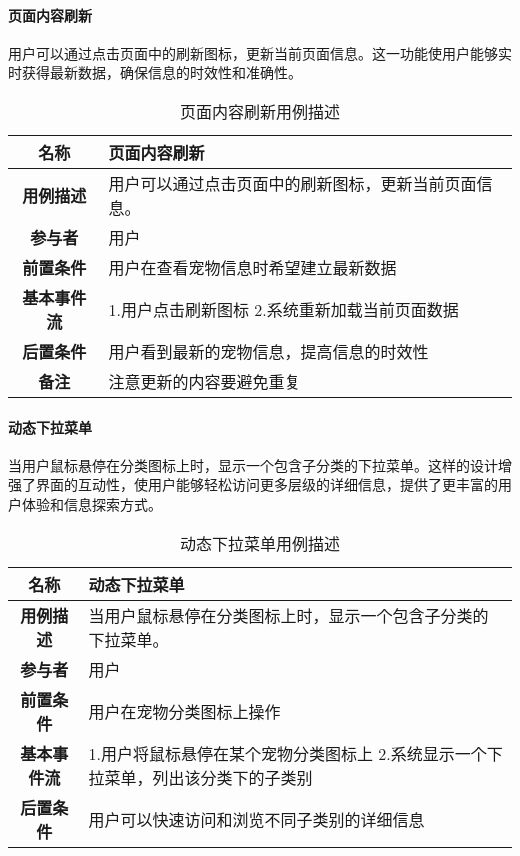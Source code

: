 \paragraph{页面内容刷新}

用户可以通过点击页面中的刷新图标，更新当前页面信息。这一功能使用户能够实时获得最新数据，确保信息的时效性和准确性。

\begin{table}[H]
	\centering
	\caption{页面内容刷新用例描述}
	\renewcommand\arraystretch{1.5}
	\begin{tabular}{|c|>{\raggedright\arraybackslash}p{10cm}|}
		\hline
		\textbf{名称} & \textbf{页面内容刷新} \\ \hline
		\textbf{用例描述} & 用户可以通过点击页面中的刷新图标，更新当前页面信息。 \\ \hline
		\textbf{参与者} & 用户 \\ \hline
		\textbf{前置条件} & 用户在查看宠物信息时希望建立最新数据 \\ \hline
		\textbf{基本事件流} &
		1.用户点击刷新图标\newline
		2.系统重新加载当前页面数据\\
		\hline
		\textbf{后置条件} & 用户看到最新的宠物信息，提高信息的时效性 \\ \hline
		\textbf{备注} & 注意更新的内容要避免重复 \\ \hline
	\end{tabular}
\end{table}

\paragraph{动态下拉菜单}

当用户鼠标悬停在分类图标上时，显示一个包含子分类的下拉菜单。这样的设计增强了界面的互动性，使用户能够轻松访问更多层级的详细信息，提供了更丰富的用户体验和信息探索方式。

\begin{table}[H]
	\centering
	\caption{动态下拉菜单用例描述}
	\renewcommand\arraystretch{1.5}
	\begin{tabular}{|c|>{\raggedright\arraybackslash}p{10cm}|}
		\hline
		\textbf{名称} & \textbf{动态下拉菜单} \\ \hline
		\textbf{用例描述} & 当用户鼠标悬停在分类图标上时，显示一个包含子分类的下拉菜单。 \\ \hline
		\textbf{参与者} & 用户 \\ \hline
		\textbf{前置条件} & 用户在宠物分类图标上操作 \\ \hline
		\textbf{基本事件流} &
		1.用户将鼠标悬停在某个宠物分类图标上\newline
		2.系统显示一个下拉菜单，列出该分类下的子类别\\
		\hline
		\textbf{后置条件} & 用户可以快速访问和浏览不同子类别的详细信息 \\ \hline
	\end{tabular}
\end{table}

